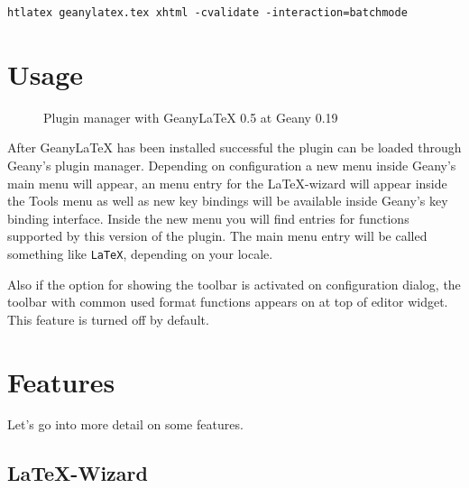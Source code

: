 \documentclass[%
paper=a4,%
fontsize=11pt,%
twoside=false,%
DIV18,%
headsepline,%
plainheadsepline,%
footsepline,%
plainfootsepline,%
bibliography=totoc,%
listof=totoc,%
BCOR10mm,%
parskip=half,%
openany,%
]{scrartcl}
\begin{document}
\begin{lstlisting}[caption={Compiling of documentation}]
htlatex geanylatex.tex xhtml -cvalidate -interaction=batchmode
\end{lstlisting}


\section{Usage}
\begin{figure}[h!]
	\caption{Plugin manager with Geany\LaTeX{} 0.5 at Geany 0.19}
\end{figure}

After Geany\LaTeX{} has been installed successful the plugin can be
loaded through Geany's plugin manager. Depending on configuration a
new menu inside Geany's main menu will appear, an menu entry for the
\LaTeX{}-wizard will appear inside the Tools menu as well as new key
bindings will be available inside Geany's key binding interface.
Inside the new menu you will find entries for functions supported by
this version of the plugin. The main menu entry will be called
something like \texttt{LaTeX}, depending on your locale.

Also if the option for showing the toolbar is activated on configuration
dialog, the toolbar with common used format functions appears on at top
of editor widget. This feature is turned off by default.


\section{Features}

Let's go into more detail on some features.


\subsection{\LaTeX-Wizard}
\end{document}
